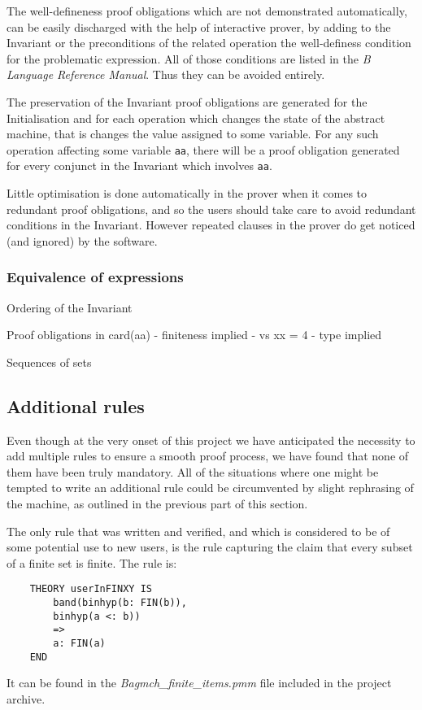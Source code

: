 \documentclass[11pt,journal]{IEEEtran}
\begin{document}
	The well-defineness proof obligations which are not demonstrated automatically, can be easily discharged with the help of interactive prover, by adding to the Invariant or the preconditions of the related operation the well-definess condition for the problematic expression. All of those conditions are listed in the \emph{B Language Reference Manual}. Thus they can be avoided entirely.
	
	The preservation of the Invariant proof obligations are generated for the Initialisation and for each operation which changes the state of the abstract machine, that is changes the value assigned to some variable. For any such operation affecting some variable \texttt{aa}, there will be a proof obligation generated for every conjunct in the Invariant which involves \texttt{aa}. 
	
	Little optimisation is done automatically in the prover when it comes to redundant proof obligations, and so the users should take care to avoid redundant conditions in the Invariant. However repeated clauses in the prover do get noticed (and ignored) by the software.
	
	\subsubsection{Equivalence of expressions}
	
	Ordering of the Invariant
	
	Proof obligations in card(aa) - finiteness implied - vs xx = 4 - type implied
	
	Sequences of sets
	
	\subsection{Additional rules}
	Even though at the very onset of this project we have anticipated the necessity to add multiple rules to ensure a smooth proof process, we have found that none of them have been truly mandatory. All of the situations where one might be tempted to write an additional rule could be circumvented by slight rephrasing of the machine, as outlined in the previous part of this section.
	
	The only rule that was written and verified, and which is considered to be of some potential use to new users, is the rule capturing the claim that every subset of a finite set is finite. The rule is:
	\begin{lstlisting}
	THEORY userInFINXY IS
		band(binhyp(b: FIN(b)), 
		binhyp(a <: b))
		=>
		a: FIN(a)
	END
	\end{lstlisting}
	It can be found in the \emph{Bagmch\_finite\_items.pmm} file included in the project archive.
	
\end{document}
